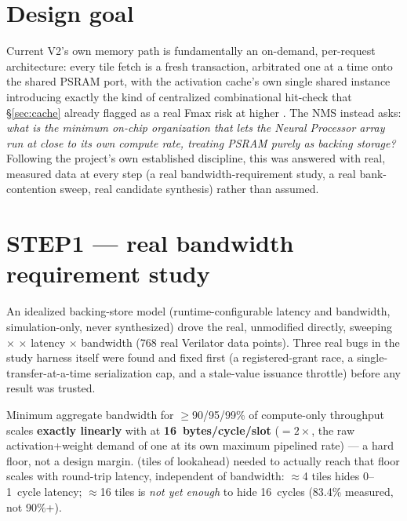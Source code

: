 \section{Design goal}
Current V2's own memory path is fundamentally an on-demand,
per-request architecture: every tile fetch is a fresh transaction,
arbitrated one at a time onto the shared PSRAM port, with the
activation cache's own single shared instance introducing exactly the
kind of centralized combinational hit-check that \S\ref{sec:cache}
already flagged as a real Fmax risk at higher . The
NMS instead asks: \emph{what is the minimum on-chip organization that
lets the Neural Processor array run at close to its own compute rate,
treating PSRAM purely as backing storage?} Following the project's own
established discipline, this was answered with real, measured data at
every step (a real bandwidth-requirement study, a real bank-contention
sweep, real candidate synthesis) rather than assumed.

\section{STEP1 --- real bandwidth requirement study}
\label{sec:nmsstep1}
An idealized backing-store model (runtime-configurable latency and
bandwidth, simulation-only, never synthesized) drove the real,
unmodified  directly, sweeping 
$\times$  $\times$ latency $\times$ bandwidth (768
real Verilator data points). Three real bugs in the study harness
itself were found and fixed first (a registered-grant race, a
single-transfer-at-a-time serialization cap, and a stale-value
issuance throttle) before any result was trusted.

\begin{fnnote}
Minimum aggregate bandwidth for $\ge$90/95/99\% of compute-only
throughput scales \textbf{exactly linearly} with  at
\textbf{16~bytes/cycle/slot} ($=2\times$, the raw
activation+weight demand of one  at its own
maximum pipelined rate) --- a hard floor, not a design margin.
 (tiles of lookahead) needed to actually reach
that floor scales with round-trip latency, independent of bandwidth:
$\approx$4 tiles hides 0--1~cycle latency; $\approx$16 tiles is
\emph{not yet enough} to hide 16~cycles (83.4\% measured, not 90\%+).
\end{fnnote}

